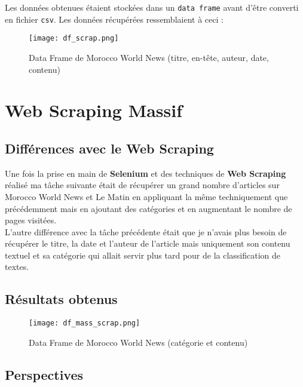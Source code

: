 \documentclass[a4paper,french,12pt]{article}
\begin{document}
\hspace{2cm}

Les données obtenues étaient stockées dans un \verb|data frame| avant d'être converti en fichier \verb|csv|. Les données récupérées ressemblaient à ceci :\\

\hspace{1cm}

\begin{figure}[!h]
    \centering
    \texttt{[image: df\_scrap.png]}
    \caption{Data Frame de Morocco World News (titre, en-tête, auteur, date, contenu)}
\end{figure}

\section{Web Scraping Massif}
\label{sec:Web Scraping Massif}

\subsection{Différences avec le Web Scraping}

Une fois la prise en main de \textbf{Selenium} et des techniques de \textbf{Web Scraping} réalisé ma tâche suivante était de récupérer un grand nombre d'articles sur Morocco World News et Le Matin en appliquant la même techniquement que précédemment mais en ajoutant des catégories et en augmentant le nombre de pages visitées.\\

L'autre différence avec la tâche précédente était que je n'avais plus besoin de récupérer le titre, la date et l'auteur de l'article mais uniquement son contenu textuel et sa catégorie qui allait servir plus tard pour de la classification de textes.

\subsection{Résultats obtenus}

\begin{figure}[!h]
    \centering
    \texttt{[image: df\_mass\_scrap.png]}
    \caption{Data Frame de Morocco World News (catégorie et contenu)}
\end{figure}

\subsection{Perspectives}
\end{document}
